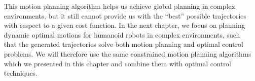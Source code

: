 \bigskip

This motion planning algorithm helps us achieve global planning in
complex environments, but it still cannot provide us with the ``best''
possible trajectories with respect to a given cost function. In the
next chapter, we focus on planning dynamic optimal motions for
humanoid robots in complex environments, such that the generated
trajectories solve both motion planning and optimal control
problems. We will therefore use the same constrained motion planning
algorithms which we presented in this chapter and combine them with
optimal control techniques.
